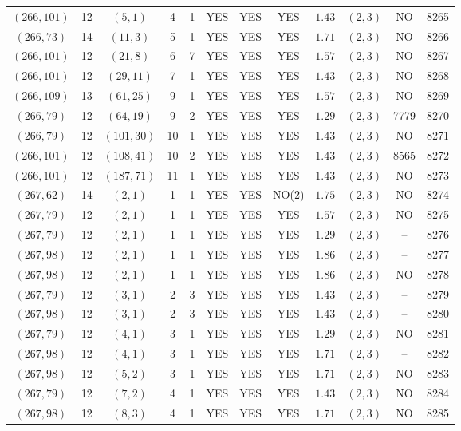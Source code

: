 \begin{longtable}{|c|c|c|c|c|c|c|c|c|c|c|c|}
$(266,101)$ & 12 & $(5,1)$ & 4 & 1 & YES & YES & YES & $1.43$ & $(2,3)$ & NO & 8265\\
$(266,73)$ & 14 & $(11,3)$ & 5 & 1 & YES & YES & YES & $1.71$ & $(2,3)$ & NO & 8266\\
$(266,101)$ & 12 & $(21,8)$ & 6 & 7 & YES & YES & YES & $1.57$ & $(2,3)$ & NO & 8267\\
$(266,101)$ & 12 & $(29,11)$ & 7 & 1 & YES & YES & YES & $1.43$ & $(2,3)$ & NO & 8268\\
$(266,109)$ & 13 & $(61,25)$ & 9 & 1 & YES & YES & YES & $1.57$ & $(2,3)$ & NO & 8269\\
$(266,79)$ & 12 & $(64,19)$ & 9 & 2 & YES & YES & YES & $1.29$ & $(2,3)$ & 7779 & 8270\\
$(266,79)$ & 12 & $(101,30)$ & 10 & 1 & YES & YES & YES & $1.43$ & $(2,3)$ & NO & 8271\\
$(266,101)$ & 12 & $(108,41)$ & 10 & 2 & YES & YES & YES & $1.43$ & $(2,3)$ & 8565 & 8272\\
$(266,101)$ & 12 & $(187,71)$ & 11 & 1 & YES & YES & YES & $1.43$ & $(2,3)$ & NO & 8273\\
$(267,62)$ & 14 & $(2,1)$ & 1 & 1 & YES & YES & NO(2) & $1.75$ & $(2,3)$ & NO & 8274\\
$(267,79)$ & 12 & $(2,1)$ & 1 & 1 & YES & YES & YES & $1.57$ & $(2,3)$ & NO & 8275\\
$(267,79)$ & 12 & $(2,1)$ & 1 & 1 & YES & YES & YES & $1.29$ & $(2,3)$ & -- & 8276\\
$(267,98)$ & 12 & $(2,1)$ & 1 & 1 & YES & YES & YES & $1.86$ & $(2,3)$ & -- & 8277\\
$(267,98)$ & 12 & $(2,1)$ & 1 & 1 & YES & YES & YES & $1.86$ & $(2,3)$ & NO & 8278\\
$(267,79)$ & 12 & $(3,1)$ & 2 & 3 & YES & YES & YES & $1.43$ & $(2,3)$ & -- & 8279\\
$(267,98)$ & 12 & $(3,1)$ & 2 & 3 & YES & YES & YES & $1.43$ & $(2,3)$ & -- & 8280\\
$(267,79)$ & 12 & $(4,1)$ & 3 & 1 & YES & YES & YES & $1.29$ & $(2,3)$ & NO & 8281\\
$(267,98)$ & 12 & $(4,1)$ & 3 & 1 & YES & YES & YES & $1.71$ & $(2,3)$ & -- & 8282\\
$(267,98)$ & 12 & $(5,2)$ & 3 & 1 & YES & YES & YES & $1.71$ & $(2,3)$ & NO & 8283\\
$(267,79)$ & 12 & $(7,2)$ & 4 & 1 & YES & YES & YES & $1.43$ & $(2,3)$ & NO & 8284\\
$(267,98)$ & 12 & $(8,3)$ & 4 & 1 & YES & YES & YES & $1.71$ & $(2,3)$ & NO & 8285\\

\end{longtable}
